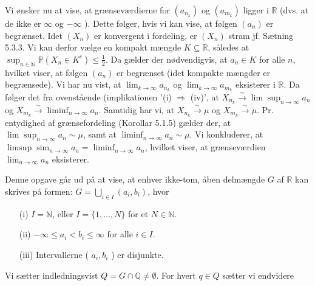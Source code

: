 \documentclass{Class}
\begin{document}
Vi ønsker nu at vise, at grænseværdierne for $\left(a_{n_k}\right)$ og $\left(a_{m_k}\right)$ ligger i $\mathbb{R}$ (dvs. at de ikke er $\infty$ og $-\infty$ ). Dette følger, hvis vi kan vise, at følgen $\left(a_n\right)$ er begrænset. Idet $\left(X_n\right)$ er konvergent i fordeling, er $\left(X_n\right)$ stram jf. Sætning 5.3.3. Vi kan derfor vælge en kompakt mængde $K \subseteq \mathbb{R}$, således at $\sup _{n \in \mathbb{N}} \mathbb{P}\left(X_n \in K^c\right) \leq \frac{1}{2}$. Da gælder der nødvendigvis, at $a_n \in K$ for alle $n$, hvilket viser, at følgen $\left(a_n\right)$ er begrænset (idet kompakte mængder er begrænsede). Vi har nu vist, at $\lim _{k \rightarrow \infty} a_{n_k}$ og $\lim _{k \rightarrow \infty} a_{m_k}$ eksisterer i $\mathbb{R}$. Da følger det fra ovenstående (implikationen '(i) $\Rightarrow$ (iv)', at $X_{n_k} \xrightarrow{\sim} \lim \sup _{n \rightarrow \infty} a_n$ og $X_{m_k} \xrightarrow{\sim} \liminf _{n \rightarrow \infty} a_n$. Samtidig har vi, at $X_{n_k} \xrightarrow{\sim} \mu$ og $X_{m_k} \xrightarrow{\sim} \mu$. Pr. entydighed af grænsefordeling (Korollar 5.1.5) gælder der, at $\lim \sup _{n \rightarrow \infty} a_n \sim \mu$, samt at $\liminf _{n \rightarrow \infty} a_n \sim \mu$. Vi konkluderer, at $\limsup \operatorname{sim}_{n \rightarrow \infty} a_n=\liminf _{n \rightarrow \infty} a_n$, hvilket viser, at grænseværdien $\lim _{n \rightarrow \infty} a_n$ eksisterer.

Denne opgave går ud på at vise, at enhver ikke-tom, åben delmængde $G$ af $\mathbb{R}$ kan skrives på formen: $G=\bigcup_{i \in I}\left(a_i, b_i\right)$, hvor
\begin{enumerate}
    \item[(i)] $I=\mathbb{N}$, eller $I=\{1, \ldots, N\}$ for et $N \in \mathbb{N}$.
    \item[(ii)] $-\infty \leq a_i<b_i \leq \infty$ for alle $i \in I$.
    \item[(iii)] Intervallerne ( $a_i, b_i$ ) er disjunkte.
\end{enumerate}
Vi sætter indledningsvist $Q=G \cap \mathbb{Q} \neq \emptyset$. For hvert $q \in Q$ sætter vi endvidere
\end{document}
